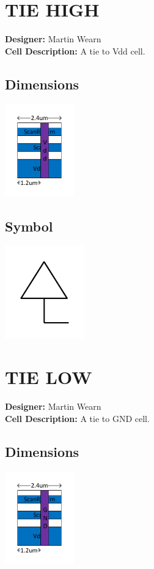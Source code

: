 \newpage

\begin{multicols}{2}
\section{TIE HIGH}
\makebox[\linewidth]{\rule{0.5\textwidth}{0.4pt}}
{\bf Designer: } Martin Wearn\\
{\bf Cell Description: } A tie to Vdd cell.\\
\subsection*{Dimensions}\includegraphics[width=\textwidth,height=4cm,keepaspectratio=true]{../tiehigh/blackbox.pdf}
\subsection*{Symbol}\includegraphics[width=\textwidth,height=4cm,keepaspectratio=true]{../tiehigh/symbol.pdf}

\section{TIE LOW}
\makebox[\linewidth]{\rule{0.5\textwidth}{0.4pt}} 
{\bf Designer: } Martin Wearn\\
{\bf Cell Description: } A  tie to GND cell.\\
\subsection*{Dimensions}\includegraphics[width=\textwidth,height=4cm,keepaspectratio=true]{../tielow/blackbox.pdf}

\end{multicols}
